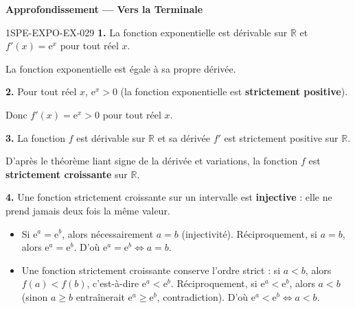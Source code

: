 \begin{center}\textbf{Approfondissement — Vers la Terminale}\end{center}
\begin{corrige}{1SPE-EXPO-EX-029}
\textbf{1.} La fonction exponentielle est dérivable sur $\mathbb{R}$ et $f'(x) = \mathrm{e}^x$ pour tout réel $x$.

La fonction exponentielle est égale à sa propre dérivée.

\textbf{2.} Pour tout réel $x$, $\mathrm{e}^x > 0$ (la fonction exponentielle est \textbf{strictement positive}).

Donc $f'(x) = \mathrm{e}^x > 0$ pour tout réel $x$.

\textbf{3.} La fonction $f$ est dérivable sur $\mathbb{R}$ et sa dérivée $f'$ est strictement positive sur $\mathbb{R}$.

D'après le théorème liant signe de la dérivée et variations, la fonction $f$ est \textbf{strictement croissante} sur $\mathbb{R}$.

\textbf{4.} Une fonction strictement croissante sur un intervalle est \textbf{injective} : elle ne prend jamais deux fois la même valeur.

\begin{itemize}
  \item Si $\mathrm{e}^a = \mathrm{e}^b$, alors nécessairement $a = b$ (injectivité). Réciproquement, si $a = b$, alors $\mathrm{e}^a = \mathrm{e}^b$. D'où $\mathrm{e}^a = \mathrm{e}^b \iff a = b$.
  \item Une fonction strictement croissante conserve l'ordre strict : si $a < b$, alors $f(a) < f(b)$, c'est-à-dire $\mathrm{e}^a < \mathrm{e}^b$. Réciproquement, si $\mathrm{e}^a < \mathrm{e}^b$, alors $a < b$ (sinon $a \geqslant b$ entraînerait $\mathrm{e}^a \geqslant \mathrm{e}^b$, contradiction). D'où $\mathrm{e}^a < \mathrm{e}^b \iff a < b$.
\end{itemize}
\end{corrige}
